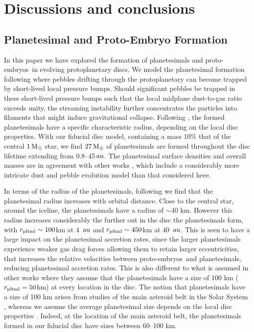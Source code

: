 \documentclass[a4paper,fleqn,usenatbib]{mnras}
\newcommand{\me}{{\, {\rm M}_{\oplus}}}
\newcommand{\msun}{{\, {\rm M}_{\odot}}}
\newcommand{\au}{{\, {\rm au}}}
\newcommand{\embs}{{{proto-embryos~}}}
\begin{document}
\section{Discussions and conclusions}
\label{sec:conclusions}

\subsection{Planetesimal and Proto-Embryo Formation}
In this paper we have explored the formation of planetesimals and \embs in evolving protoplanetary discs.
We model the planetesimal formation following \citet{Lenz19} where pebbles drifting through the protoplanetary can become trapped by short-lived local pressure bumps.
Should significant pebbles be trapped in these short-lived pressure bumps such that the local midplane dust-to-gas ratio exceeds unity, the streaming instability further concentrates the particles into filaments that might induce gravitational collapse.
Following \citet{Liu20}, the formed planetesimals have a specific characteristic radius, depending on the local disc properties.
With our fiducial disc model, containing a mass $10\%$ that of the central $1\msun$ star, we find $27 \me$ of planetesimals are formed throughout the disc lifetime extending from 0.8--45$\au$.
The planetesimal surface densities and overall masses are in agreement with other works \citep[e.g.][]{Lenz19,Voelkel20}, which include a considerably more intricate dust and pebble evolution model than that considered here.

In terms of the radius of the planetesimals, following \citep{Liu20} we find that the planetesimal radius increases with orbital distance.
Close to the central star, around the iceline, the planetesimals have a radius of $\sim$40 km.
However this radius increases considerably the further out in the disc the planetesimals form, with $r_{\rm pltml}\sim100$km at 4 $\au$ and  $r_{\rm pltml}\sim450$km at 40 $\au$.
This is seen to have a large impact on the planetesimal accretion rates, since the larger planetesimals experience weaker gas drag forces allowing them to retain larger eccentricities, that increases the relative velocities between \embs and planetesimals, reducing planetesimal accretion rates.
This is also different to what is assumed in other works \citep{Lenz19,Voelkel20} where they assume that the planetesimals have a size of 100 km ($r_{\rm pltml}=50$km) at every location in the disc.
The notion that planetesimals have a size of 100 km arises from studies of the main asteroid belt in the Solar System \citep{Morbidelli09,Delbo17}, whereas we assume the average planetesimal size depends on the local disc properties \citep{Liu20}.
Indeed, at the location of the main asteroid belt, the planetesimals formed in our fiducial disc have sizes between 60--100 km.
\end{document}
